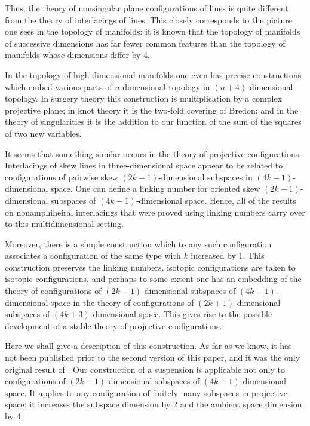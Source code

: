 \documentclass{article}
\begin{document}
Thus, the theory of nonsingular plane configurations of lines is quite
different from the theory of interlacings of lines. This closely corresponds to
the picture one sees in the topology of manifolds: it is known that the
topology of manifolds of successive dimensions has far fewer common features
than the topology of manifolds whose dimensions differ by 4. 

In the topology of
high-dimensional manifolds one even has precise constructions which embed
various parts of $n$-dimensional topology in $(n+4)$-dimensional topology. In
surgery theory this construction is multiplication
by a complex projective plane;
in knot theory it is the two-fold covering of Bredon; and in the theory of
singularities it is the addition to our function of the sum of the squares of
two new variables. 

It seems that something similar occurs in the theory of
projective configurations. Interlacings of skew lines in three-dimensional
space appear to be related to configurations of pairwise skew
$(2k-1)$-dimensional subspaces in $(4k-1)$-dimensional space. One can define a
linking number for oriented skew $(2k-1)$-dimensional subspaces of
$(4k-1)$-dimensional space. Hence, all of the results on nonamphiheiral interlacings
that were proved using linking numbers carry over to this multidimensional
setting. 

Moreover, there is a simple construction which to any such
configuration associates a configuration of the same type with $k$ increased by
1.
This construction preserves the linking numbers, isotopic configurations
are taken to isotopic configurations, and perhaps to some extent one has an
embedding of the theory of configurations of $(2k-1)$-dimensional subspaces of
$(4k-1)$-dimensional space in the theory of configurations of
$(2k+1)$-dimensional subspaces of $(4k+3)$-dimensional space. This gives rise
to the possible development of a stable theory of projective configurations.
 

Here we shall give a description of this construction. As far as we know,
it has not been published prior to the second version \cite{2} of this
paper, and it was the only original result of \cite{2}. 
Our construction of a suspension is applicable not only to configurations of
 $(2k-1)$-dimensional subspaces of $(4k-1)$-dimensional space.
It applies to any configuration  of finitely many subspaces in projective
space; it increases the subspace dimension by 2 and the ambient space dimension
by 4.
\end{document}
